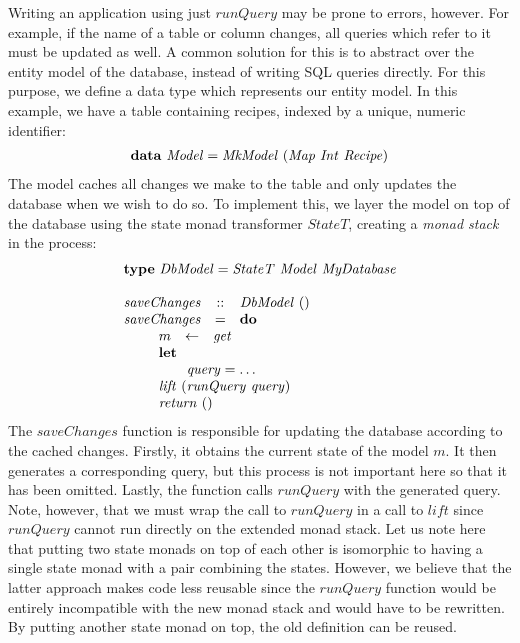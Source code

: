 Writing an application using just $\mathit{runQuery}$ may be prone to errors, however. For example, if the name of a table or column changes, all queries which refer to it must be updated as well. A common solution for this is to abstract over the entity model of the database, instead of writing SQL queries directly. For this purpose, we define a data type which represents our entity model. In this example, we have a table containing recipes, indexed by a unique, numeric identifier:
\begin{displaymath}
\begin{array}{lcl}
\multicolumn{3}{l}{\mathbf{data}~\mathit{Model} = \mathit{MkModel}~(\mathit{Map}~\mathit{Int}~\mathit{Recipe})}
\end{array}
\end{displaymath}
The model caches all changes we make to the table and only updates the database when we wish to do so. To implement this, we layer the model on top of the database using the state monad transformer $\mathit{StateT}$, creating a \emph{monad stack} in the process:
\begin{displaymath}
\begin{array}{lcl}
\multicolumn{3}{l}{\mathbf{type}~\mathit{DbModel} = \mathit{StateT}~\mathit{Model}~\mathit{MyDatabase}}\\\\
\mathit{saveChanges} & :: & \mathit{DbModel}~() \\
\mathit{saveChanges} & = & \mathbf{do} \\
\multicolumn{3}{l}{\qquad \begin{array}{lcl}
    m & \leftarrow & \mathit{get} \\
    \multicolumn{3}{l}{\mathbf{let}} \\
    \multicolumn{3}{l}{\qquad \mathit{query} = \ldots} \\
    \multicolumn{3}{l}{\mathit{lift}~(\mathit{runQuery}~\mathit{query})}\\
    \multicolumn{3}{l}{\mathit{return}~()}
\end{array} }
\end{array}
\end{displaymath}
The $\mathit{saveChanges}$ function is responsible for updating the database according to the cached changes. Firstly, it obtains the current state of the model $m$. It then generates a corresponding query, but this process is not important here so that it has been omitted. Lastly, the function calls $\mathit{runQuery}$ with the generated query. Note, however, that we must wrap the call to $\mathit{runQuery}$ in a call to $\mathit{lift}$ since $\mathit{runQuery}$ cannot run directly on the extended monad stack. Let us note here that putting two state monads on top of each other is isomorphic to having a single state monad with a pair combining the states. However, we believe that the latter approach makes code less reusable since the $\mathit{runQuery}$ function would be entirely incompatible with the new monad stack and would have to be rewritten. By putting another state monad on top, the old definition can be reused.


